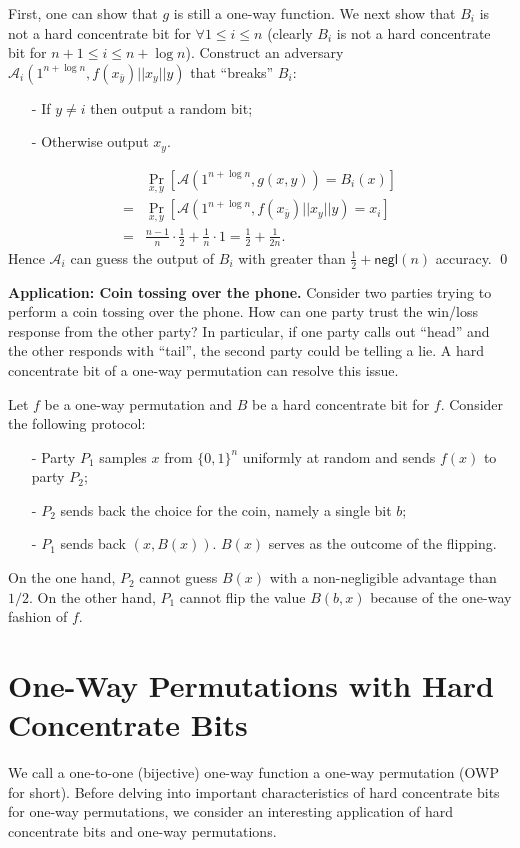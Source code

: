 \documentclass[12pt]{tufte-book}
\begin{document}
First, one can show that $g$ is still a one-way function. 
We next show that $B_i$ is not a hard concentrate bit for $\forall 1 \leq i \leq n$ (clearly $B_i$ is not a hard concentrate bit for $n+1 \leq i \leq n+\log n$).
Construct an adversary $\mathcal{A}_i(1^{n+\log n}, f(x_{\bar y}) || x_y || y)$ that ``breaks'' $B_i$:
\begin{itemize}
\item[-] If $y \not= i$ then output a random bit;
\item[-] Otherwise output $x_y$.
\end{itemize}
\begin{align*}
& \Pr_{x, y}[\mathcal{A}(1^{n+\log n}, g(x,y)) = B_i(x)]\\
=& \Pr_{x, y}[\mathcal{A}(1^{n+\log n}, f(x_{\bar y}) || x_y || y) = x_i]\\
=& \frac{n-1}{n} \cdot \frac{1}{2} + \frac{1}{n} \cdot 1 = \frac{1}{2} + \frac{1}{2n}.
\end{align*}
Hence $\mathcal{A}_i$ can guess the output of $B_i$ with greater than $\frac{1}{2} + \mathsf{negl}(n)$ accuracy.
\qed

\bigskip
\noindent\textbf{Application: Coin tossing over the phone.}
Consider two parties trying to perform a coin tossing over the phone.  How can one party trust the win/loss response from the other party?  In particular, if one party calls out ``head'' and the other responds with ``tail'', the second party could be telling a lie.
A hard concentrate bit of a one-way permutation can resolve this issue.

Let $f$ be a one-way permutation and $B$ be a hard concentrate bit for $f$. Consider the following protocol:
\begin{itemize}
\item[-] Party $P_1$ samples $x$ from $\{0,1\}^n$ uniformly at random and sends $f(x)$ to party $P_2$;
\item[-] $P_2$ sends back the choice for the coin, namely a single bit $b$;
\item[-] $P_1$ sends back $(x, B(x))$.  $B(x)$ serves as the outcome of the flipping.
\end{itemize}
On the one hand, $P_2$ cannot guess $B(x)$ with a non-negligible advantage than $1/2$.
On the other hand, $P_1$ cannot flip the value $B(b,x)$  because of the one-way fashion of $f$. 

\section{One-Way Permutations with Hard Concentrate Bits}
We call a one-to-one (bijective) one-way function a one-way permutation (OWP for short).
Before delving into important characteristics of hard concentrate bits for one-way permutations, we consider an interesting application of hard concentrate bits and one-way permutations.
\end{document}
